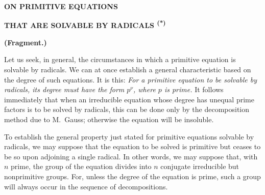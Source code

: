 
\providecommand{\GalSourcePageStart}[4]{}%
\providecommand{\GalSourcePageBoundary}[4]{\space}%
\providecommand{\GalSourceBlankPage}[4]{}%
\providecommand{\GalPrintedError}[2]{#1}%
\providecommand{\GalSourceError}[2]{#1}%
\providecommand{\GalWitnessVariant}[2]{#1}%
\providecommand{\GalNotationAnomaly}[2]{#1}%
\providecommand{\GalHistoricalFootnoteMark}[1]{\textsuperscript{(#1)}}%
\providecommand{\GalHistoricalFootnoteText}[2]{\footnotetext{#2}}%

\GalSourcePageStart{080}{L0079}{51}{51}


\begin{center}
{\scriptsize\bfseries ON PRIMITIVE EQUATIONS\par}
\vspace{0.45em}
{\scriptsize\bfseries THAT ARE SOLVABLE BY RADICALS \GalHistoricalFootnoteMark{*}\par}
\vspace{0.45em}
{\scriptsize\bfseries (Fragment.)\par}
\end{center}
\GalHistoricalFootnoteText{*}{\emph{See} Note 1 on page 33.}

Let us seek, in general, the circumstances in which a primitive equation is
solvable by radicals. We can at once establish a general characteristic based
on the degree of such equations. It is this: {\itshape For a primitive equation
to be solvable by radicals, its degree must have the form $p^{\nu}$, where $p$
is prime.} It follows immediately that when an irreducible equation whose
degree has unequal prime factors is to be solved by radicals, this can be done
only by the decomposition method due to M.~Gauss; otherwise the equation will
be insoluble.

To establish the general property just stated for primitive equations solvable
by radicals, we may suppose that the equation to be solved is primitive but
ceases to be so upon adjoining a single radical. In other words, we may suppose
that, with $n$ prime, the group of the equation divides into $n$ conjugate
irreducible but nonprimitive groups. For, unless the degree of the equation is
prime, such a group will always occur in the sequence of decompositions.

